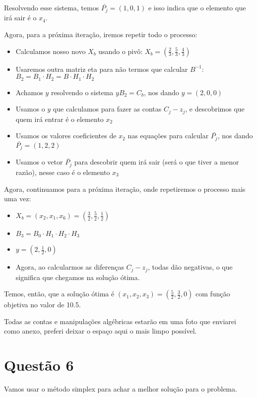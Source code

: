 \documentclass[11pt]{article}
\begin{document}
Resolvendo esse sistema, temos \(\bar{P_j} = (1, 0, 1)\) e isso indica que o elemento que irá sair é o \(x_4\).

Agora, para a próxima iteração, iremos repetir todo o processo:

\begin{itemize}
\item Calculamos nosso novo \(X_b\) usando o pivô: \(X_b = (\frac{2}{3}, \frac{5}{3}, \frac{4}{3})\)
\item Usaremos outra matriz eta para não termos que calcular \(B^{-1}\): \(B_2 = B_1\cdot H_2 = B\cdot H_1\cdot H_2\)
\item Achamos \(y\) resolvendo o sistema \(yB_2 = C_b\), nos dando \(y = (2, 0, 0)\)
\item Usamos o \(y\) que calculamos para fazer as contas \(C_j-z_j\), e descobrimos que quem irá entrar é o elemento \(x_2\)
\item Usamos os valores coeficientes de \(x_2\) nas equações para calcular \(\bar{P_j}\), nos dando \(\bar{P_j} = (1, 2, 2)\)
\item Usamos o vetor \(\bar{P_j}\) para descobrir quem irá sair (será o que tiver a menor razão), nesse caso é o elemento \(x_3\)
\end{itemize}

Agora, continuamos para a próxima iteração, onde repetiremos o processo mais uma vez:

\begin{itemize}
\item \(X_b = (x_2, x_1, x_6) = (\frac{3}{2}, \frac{5}{2}, \frac{1}{2})\)
\item \(B_3 = B_0\cdot H_1\cdot H_2\cdot H_3\)
\item \(y = (2, \frac{1}{2}, 0)\)
\item Agora, ao calcularmos as diferenças \(C_j-z_j\), todas dão negativas, o que significa que chegamos na solução ótima.
\end{itemize}

Temos, então, que a solução ótima é \((x_1, x_2, x_3) = (\frac{5}{2}, \frac{3}{2}, 0)\) com função objetiva no valor de 10.5.

Todas as contas e manipulações algébricas estarão em uma foto que enviarei como anexo, preferi deixar o espaço aqui o mais limpo possível.

\section{Questão 6}
\label{sec:org98809e0}
Vamos usar o método simplex para achar a melhor solução para o problema.
\end{document}
